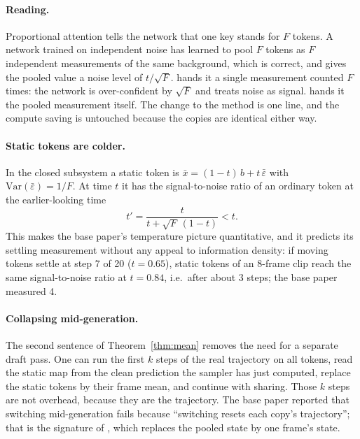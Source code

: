 \paragraph{Reading.}
Proportional attention tells the network that one key stands for $F$ tokens.
A network trained on independent noise has learned to pool $F$ tokens as $F$ independent measurements of the same background, which is correct, and gives the pooled value a noise level of $t/\sqrt F$.
\Copy{} hands it a single measurement counted $F$ times: the network is over-confident by $\sqrt F$ and treats noise as signal.
\Mean{} hands it the pooled measurement itself.
The change to the method is one line, and the compute saving is untouched because the copies are identical either way.

\paragraph{Static tokens are colder.}
In the closed subsystem a static token is $\bar x=(1-t)\,b+t\,\bar\varepsilon$ with $\mathrm{Var}(\bar\varepsilon)=1/F$.
At time $t$ it has the signal-to-noise ratio of an ordinary token at the earlier-looking time
\begin{equation}
t'=\frac{t}{t+\sqrt F\,(1-t)}<t .
\label{eq:clock}
\end{equation}
This makes the base paper's temperature picture quantitative, and it predicts its settling measurement without any appeal to information density: if moving tokens settle at step 7 of 20 ($t=0.65$), static tokens of an 8-frame clip reach the same signal-to-noise ratio at $t=0.84$, i.e.\ after about 3 steps; the base paper measured 4.

\paragraph{Collapsing mid-generation.}
The second sentence of Theorem~\ref{thm:mean} removes the need for a separate draft pass.
One can run the first $k$ steps of the real trajectory on all tokens, read the static map from the clean prediction the sampler has just computed, replace the static tokens by their frame mean, and continue with sharing.
Those $k$ steps are not overhead, because they are the trajectory.
The base paper reported that switching mid-generation fails because ``switching resets each copy's trajectory''; that is the signature of \Copy{}, which replaces the pooled state by one frame's state.

